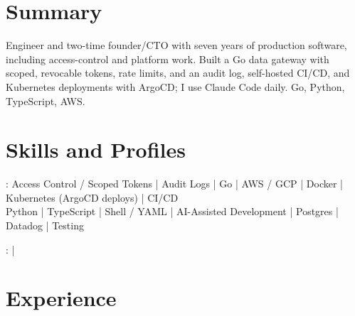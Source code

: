 \documentclass[print]{jack-resume}
\begin{document}
\pagecolor{darkmodeBackground}


\begin{minipage}[t][1cm][t]{.03\textwidth}
    \hfill
\end{minipage}

\section{Summary}
Engineer and two-time founder/CTO with seven years of production software, including access-control and platform work. Built a Go data gateway with scoped, revocable tokens, rate limits, and an audit log, self-hosted CI/CD, and Kubernetes deployments with ArgoCD; I use Claude Code daily. Go, Python, TypeScript, AWS.
\sectionsep

\section{Skills and Profiles}
:
Access Control / Scoped Tokens \hfill | \hfill
Audit Logs \hfill | \hfill
Go \hfill | \hfill
AWS / GCP \hfill | \hfill
Docker \hfill | \hfill
Kubernetes (ArgoCD deploys) \hfill | \hfill
CI/CD \\
\hspace{1.0cm} Python \hfill | \hfill
TypeScript \hfill | \hfill
Shell / YAML \hfill | \hfill
AI-Assisted Development \hfill | \hfill
Postgres \hfill | \hfill
Datadog \hfill | \hfill
Testing \\

\raggedright{
    :
      \href{https://www.linkedin.com/in/jack-sturtevant/}{ \ExternalLink} |
     \href{https://github.com/jacksturt}{ \ExternalLink}}

\section{Experience}
\end{document}
